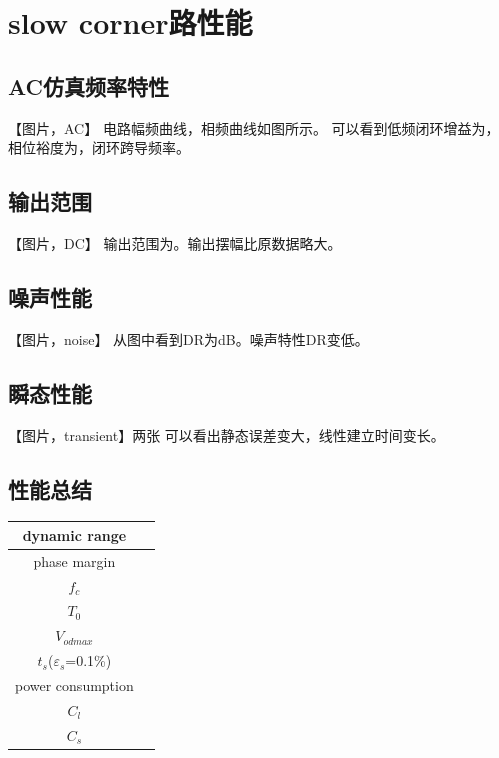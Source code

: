 \documentclass[a4paper]{article}
\begin{document}
\newpage
\clearpage

\section{slow corner路性能}
\subsection{AC仿真频率特性}
【图片，AC】
电路幅频曲线，相频曲线如图所示。
可以看到低频闭环增益为，相位裕度为，闭环跨导频率。
\newpage
\clearpage
\subsection{输出范围}
【图片，DC】
输出范围为。输出摆幅比原数据略大。
\newpage
\clearpage
\subsection{噪声性能}
【图片，noise】
从图中看到DR为dB。噪声特性DR变低。
\newpage
\clearpage
\subsection{瞬态性能}
【图片，transient】两张
可以看出静态误差变大，线性建立时间变长。
\newpage
\clearpage
\subsection{性能总结}
\begin{table}[htbp]
    \begin{tabular}{|c|c|}
        \hline
        dynamic range&\\
        \hline
        phase margin&\\
        \hline
        $f_c$ &\\
        \hline 
        $T_0$&\\
        \hline
        $V_{odmax}$&\\
        \hline
        $t_s$($\varepsilon_s$=0.1\%)&\\
        \hline
        power consumption&\\
        \hline
        $C_l$&\\
        \hline
        $C_s$&\\
        \hline
    \end{tabular}
\end{table}
\end{document}
